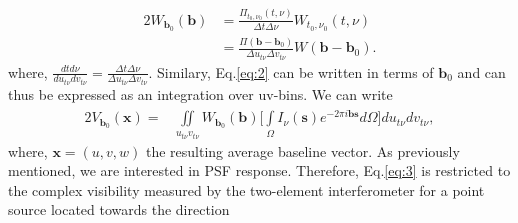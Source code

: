\begin{alignat}{2}
W_{\mathbf{b}_0}(\mathbf{b}) &=	\frac{\Pi_{t_0,\nu_0}(t,\nu)}{\Delta t \Delta \nu}W_{t_0,\nu_0}(t,\nu)\\
			      &=\frac{\Pi(\mathbf{b}-\mathbf{b}_0)}{\Delta u_{t\nu} \Delta v_{t\nu}}W(\mathbf{b}-\mathbf{b}_0).\label{eq:W}
\end{alignat}
% 
% 
where, $\frac{dt d\nu}{du_{t\nu} dv_{t\nu}}=\frac{\Delta t \Delta \nu}{\Delta u_{t\nu} \Delta v_{t\nu}}$. Similary,  Eq.\ref{eq:2} can be written in terms 
of $\mathbf{b}_0$ and can thus be expressed as an integration over uv-bins.
We can write
\begin{alignat}{2}
V_{\mathbf{b}_0}(\mathbf{x})  =& \iint\limits_{u_{t\nu}v_{t\nu}}^{}W_{\mathbf{b}_0}(\mathbf{b})\bigg[\int\limits_{\Omega}^{}I_{\nu}(\mathbf{s})e^{-2\pi i \mathbf{b}\mathbf{s}}d\Omega \bigg]du_{t\nu} dv_{t\nu},  \label{eq:3}
\end{alignat}
where, $\mathbf{x}=(u,v,w)$ the resulting average baseline vector.
As previously mentioned, we are interested in PSF response. Therefore, Eq.\ref{eq:3} is restricted to the
complex visibility measured by the two-element interferometer for a point source located towards the direction 
